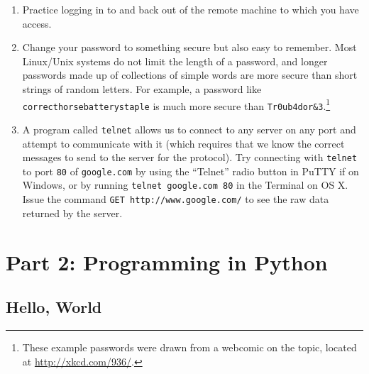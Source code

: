 \documentclass[
]{memoir}
\providecommand{\tightlist}{%
  \setlength{\itemsep}{0pt}\setlength{\parskip}{0pt}}
\begin{document}
\begin{enumerate}
\def\labelenumi{\arabic{enumi}.}
\tightlist
\item
  Practice logging in to and back out of the remote machine to which you have access.
\item
  Change your password to something secure but also easy to remember. Most Linux/Unix systems do not limit the length of a password, and longer passwords made up of collections of simple words are more secure than short strings of random letters. For example, a password like \texttt{correcthorsebatterystaple} is much more secure than \texttt{Tr0ub4dor\&3}.\footnote{These example passwords were drawn from a webcomic on the topic, located at \url{http://xkcd.com/936/}.}
\item
  A program called \texttt{telnet} allows us to connect to any server on any port and attempt to communicate with it (which requires that we know the correct messages to send to the server for the protocol). Try connecting with \texttt{telnet} to port \texttt{80} of \texttt{google.com} by using the \enquote{Telnet} radio button in PuTTY if on Windows, or by running \texttt{telnet\ google.com\ 80} in the Terminal on OS X. Issue the command \texttt{GET\ http://www.google.com/} to see the raw data returned by the server.
\end{enumerate}

\hypertarget{part-part-2-programming-in-python}{%
\part*{Part 2: Programming in Python}\label{part-part-2-programming-in-python}}

\hypertarget{hello-world}{%
\chapter{Hello, World}\label{hello-world}}
\end{document}
